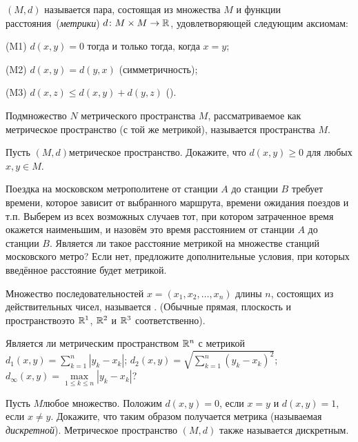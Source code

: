 \documentclass[a4paper,12pt]{article}
\begin{document}

 $(M, d)$ называется пара, состоящая из множества $M$ и функции  расстояния\ (\emph{метрики}) $d\colon M\times M \rightarrow \mathbb{R}$, удовлетворяющей следующим аксиомам:
\begin{items}{-3}
\item[(M1)]
$d(x,y) = 0$ тогда и только тогда, когда $x=y$;
\item[(M2)]
$d(x,y) = d(y,x)$ ( симметричность);
\item[(M3)]
$d(x,z)\le d(x,y)+d(y,z)$ ().
\end{items}

Подмножество $N$ метрического пространства $M$, рассматриваемое как метрическое пространство (с той же метрикой), называется  пространства $M$.

Пусть $(M, d)$\т метрическое пространство. Докажите, что $d(x,y)\ge0$ для любых $x,y\in M$.

Поездка на московском метрополитене от станции $A$ до станции $B$ требует времени, которое зависит от выбранного маршрута, времени ожидания поездов
и т.п. Выберем из всех возможных случаев тот, при котором затраченное время окажется наименьшим, и назовём это время расстоянием от станции $A$ до станции $B$. Является ли такое расстояние метрикой на множестве станций московского метро? Если нет, предложите дополнительные условия, при которых введённое
расстояние будет метрикой.

Множество последовательностей $x=(x_1,x_2,\dots,x_n)$ длины $n$, состоящих из действительных чисел, называется . (Обычные прямая, плоскость и пространство\т это $\mathbb{R}^1$,
$\mathbb{R}^2$ и $\mathbb{R}^3$ соответственно).

\label{R^n}
Является ли метрическим пространством $\mathbb{R}^n$ с метрикой\\
$d_1(x,y)=\sum\limits_{k=1}^{n}|y_k-x_k|$;
$d_2(x,y)=\sqrt{\sum\limits_{k=1}^{n}(y_k-x_k)^2}$;
$d_\infty(x,y)=\max\limits_{1\le k\le n}|y_k-x_k|$?

Пусть $M$\т любое множество. Положим $d(x,y)=0$, если $x=y$ и $d(x,y)=1$, если $x\ne y$. Докажите, что таким образом получается метрика (называемая \emph{дискретной}). Метрическое пространство $(M, d)$ также называется  дискретным.
\end{document}
